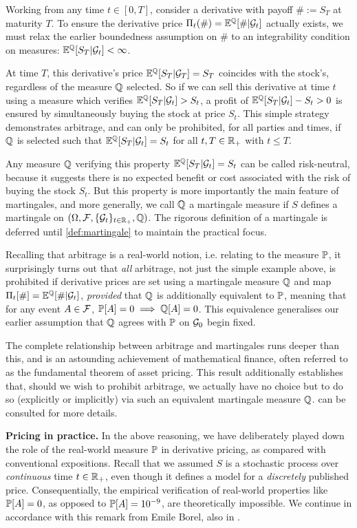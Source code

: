 Working from any time $t\in[0,T]$, consider a derivative with payoff $\#:=S_T$ at maturity $T$. To ensure the derivative price $\Pi_t(\#)=\mathbb{E}^{\mathbb{Q}}[\#|\mathcal{G}_t]$ actually exists, we must relax the earlier boundedness assumption on $\#$ to an integrability condition on measures: $\mathbb{E}^{\mathbb{Q}}[S_T|\mathcal{G}_t]<\infty$.

At time $T$, this derivative's price $\mathbb{E}^{\mathbb{Q}}[S_T|\mathcal{G}_T]=S_T$ coincides with the stock's, regardless of the measure $\mathbb{Q}$ selected. So if we can sell this derivative at time $t$ using a measure which verifies $\mathbb{E}^{\mathbb{Q}}[S_T|\mathcal{G}_t]>S_t$, a profit of $\mathbb{E}^{\mathbb{Q}}[S_T|\mathcal{G}_t] - S_t>0$ is ensured by simultaneously buying the stock at price $S_t$. This simple strategy demonstrates arbitrage, and can only be prohibited, for all parties and times, if $\mathbb{Q}$ is selected such that $\mathbb{E}^{\mathbb{Q}}[S_T|\mathcal{G}_t]=S_t$ for all $t,T\in\mathbb{R}_+$ with $t\le T$.

Any measure $\mathbb{Q}$ verifying this property $\mathbb{E}^{\mathbb{Q}}[S_T|\mathcal{G}_t]=S_t$ can be called risk-neutral, because it suggests there is no expected benefit or cost associated with the risk of buying the stock $S_t$. But this property is more importantly the main feature of martingales, and more generally, we call $\mathbb{Q}$ a martingale measure if $S$ defines a martingale on $(\Omega,\mathcal{F},\{\mathcal{G}_t\}_{t\in\mathbb{R}_+},\mathbb{Q})$. The rigorous definition of a martingale is deferred until \autoref{def:martingale} to maintain the practical focus.

Recalling that arbitrage is a real-world notion, i.e. relating to the measure $\mathbb{P}$, it surprisingly turns out that \emph{all} arbitrage, not just the simple example above, is prohibited if derivative prices are set using a martingale measure $\mathbb{Q}$ and map $\Pi_t[\#]=\mathbb{E}^{\mathbb{Q}}[\#|\mathcal{G}_t]$, \emph{provided} that $\mathbb{Q}$ is additionally equivalent to $\mathbb{P}$, meaning that for any event $A\in\mathcal{F}$, $\mathbb{P}[A]=0\implies \mathbb{Q}[A]=0$. This equivalence generalises our earlier assumption that $\mathbb{Q}$ agrees with $\mathbb{P}$ on $\mathcal{G}_0$ begin fixed.

The complete relationship between arbitrage and martingales runs deeper than this, and is an astounding achievement of mathematical finance, often referred to as the fundamental theorem of asset pricing. This result additionally establishes that, should we wish to prohibit arbitrage, we actually have no choice but to do so (explicitly or implicitly) via such an equivalent martingale measure $\mathbb{Q}$. \cite{cont_2003} can be consulted for more details.

\vspace{3mm}\textbf{Pricing in practice.} In the above reasoning, we have deliberately played down the role of the real-world measure $\mathbb{P}$ in derivative pricing, as compared with conventional expositions. Recall that we assumed $S$ is a stochastic process over \emph{continuous} time $t\in\mathbb{R}_+$, even though it defines a model for a \emph{discretely} published price. Consequentially, the empirical verification of real-world properties like $\mathbb{P}[A]=0$, as opposed to $\mathbb{P}[A]=10^{-9}$, are theoretically impossible. We continue in accordance with this remark from Emile Borel, also in \cite{cont_2003}.

